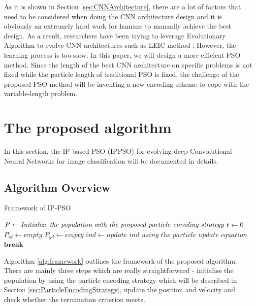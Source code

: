 \documentclass[conference]{IEEEtran}
\begin{document}
As it is shown in Section \ref{sec:CNNArchitecture}, there are a lot of factors that need to be considered when doing the CNN architecture design and it is obviously an extremely hard work for humans to manually achieve the best design. As a result, researchers have been trying to leverage Evolutionary Algorithm to evolve CNN architectures such as LEIC method \cite{LEIC:Real}; However, the learning process is too slow. In this paper, we will design a more efficient PSO method. Since the length of the best CNN architecture on specific problems is not fixed while the particle length of traditional PSO is fixed, the challenge of the proposed PSO method will be inventing a new encoding scheme to cope with the variable-length problem. 

\section{The proposed algorithm}\label{sec:ProposedAlgorithm}
In this section, the IP based PSO (IPPSO) for evolving deep Convolutional Neural Networks for image classification will be documented in details. 


\subsection{Algorithm Overview}
\begin{algorithm}
	\caption{Framework of IP-PSO}
	\label{alg:framework}
	\begin{algorithmic}
		\renewcommand{\algorithmicrequire}{\textbf{Input:}}
		\renewcommand{\algorithmicensure}{\textbf{Output:}}
		\STATE $P \leftarrow \textit{Initialize the population with the proposed particle}\linebreak \textit{ encoding strategy}$
		\STATE $t \leftarrow 0$
		\STATE $P_{id} \leftarrow empty$
		\STATE $P_{gd} \leftarrow empty$
		\STATE $ind \leftarrow \textit{update ind using the particle update equation}$
		\STATE $\textbf{break}$
		\ENDIF
		\ENDFOR
		\ENDWHILE		
	\end{algorithmic}
\end{algorithm}

Algorithm \ref{alg:framework} outlines the framework of the proposed algorithm. There are mainly three steps which are really straightforward - initialise the population by using the particle encoding strategy which will be described in Section \ref{sec:ParticleEncodingStrategy}, update the position and velocity and check whether the termination criterion meets.
\end{document}
